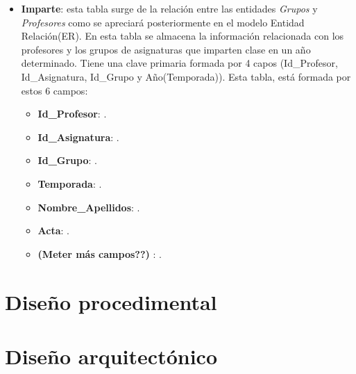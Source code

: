 \begin{itemize}
\item
\textbf{Imparte}: esta tabla surge de la relación entre las entidades \emph{Grupos} y \emph{Profesores} como se apreciará posteriormente en el modelo Entidad Relación(ER). En esta tabla se almacena la información relacionada con los profesores y los grupos de asignaturas que imparten clase en un año determinado. Tiene una clave primaria formada por 4 capos (Id_Profesor, Id_Asignatura, Id_Grupo y Año(Temporada)). Esta tabla, está formada por estos 6 campos:
\begin{itemize}
\item
\textbf{Id_Profesor}: .
\item
\textbf{Id_Asignatura}: .
\item
\textbf{Id_Grupo}: .
\item
\textbf{Temporada}: .
\item
\textbf{Nombre_Apellidos}: .
\item
\textbf{Acta}: .
\item
\textbf{     (Meter más campos??) }: .
\end{itemize}

\end{itemize}





\section{Diseño procedimental}

\section{Diseño arquitectónico}



